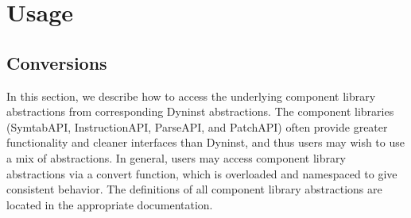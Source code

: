 \section{Usage}

\subsection{Conversions}
In this section, we describe how to access the underlying component library abstractions from corresponding
Dyninst abstractions. The component libraries (SymtabAPI, InstructionAPI, ParseAPI, and PatchAPI) often
provide greater functionality and cleaner interfaces than Dyninst, and thus users may wish to use a mix
of abstractions. In general, users may access component library abstractions via a convert function, which
is overloaded and namespaced to give consistent behavior. The definitions of all component library
abstractions are located in the appropriate documentation.

